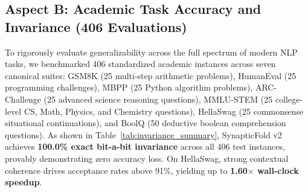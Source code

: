 \documentclass[journal,10pt,twocolumn]{article}
\theoremstyle{definition}
\begin{document}
\subsection{Aspect B: Academic Task Accuracy and Invariance (406 Evaluations)}

To rigorously evaluate generalizability across the full spectrum of modern NLP tasks, we benchmarked 406 standardized academic instances across seven canonical suites: GSM8K (25 multi-step arithmetic problems), HumanEval (25 programming challenges), MBPP (25 Python algorithm problems), ARC-Challenge (25 advanced science reasoning questions), MMLU-STEM (25 college-level CS, Math, Physics, and Chemistry questions), HellaSwag (25 commonsense situational continuations), and BoolQ (50 deductive boolean comprehension questions). As shown in Table~\ref{tab:invariance_summary}, SynapticFold v2 achieves \textbf{100.0\% exact bit-a-bit invariance} across all 406 test instances, provably demonstrating zero accuracy loss. On HellaSwag, strong contextual coherence drives acceptance rates above 91\%, yielding up to \textbf{1.60$\times$ wall-clock speedup}.

\begin{table}[ht]
\centering
{}
\caption{Cross-Domain Benchmark Invariance and Speedup (406 Evaluations Total).}
\label{tab:invariance_summary}
\end{table}
\end{document}

